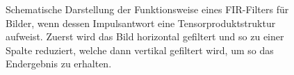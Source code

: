 \begin{remark}
\begin{figure}[ht]
\caption{Schematische Darstellung der Funktionsweise eines FIR-Filters für Bilder, wenn dessen
  Impulsantwort eine Tensorproduktstruktur aufweist. Zuerst wird das Bild horizontal gefiltert
  und so zu einer Spalte reduziert, welche dann vertikal gefiltert wird, um so das Endergebnis zu
  erhalten.}
\label{fig:FIR-Filter-2D}
\end{figure}
\end{remark}

